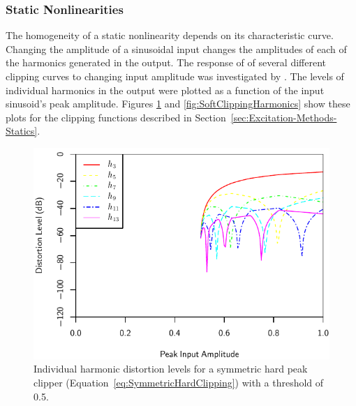 		\subsubsection*{Static Nonlinearities}
			The homogeneity of a static nonlinearity depends on its characteristic curve. Changing the
			amplitude of a sinusoidal input changes the amplitudes of each of the harmonics generated in the
			output. The response of of several different clipping curves to changing input amplitude was
			investigated by \citet{enderby2012harmonic}. The levels of individual harmonics in the output were
			plotted as a function of the input sinusoid's peak amplitude. Figures
			\ref{fig:HardClippingHarmonics} and \ref{fig:SoftClippingHarmonics} show these plots for the
			clipping functions described in Section~\ref{sec:Excitation-Methods-Statics}.

			\begin{figure}[h!]
				\centering
				\includegraphics{chapter5/Images/HardClippingHarmonics.pdf}
				\caption{Individual harmonic distortion levels for a symmetric hard peak clipper
					 (Equation~\ref{eq:SymmetricHardClipping}) with a threshold of 0.5.}
				\label{fig:HardClippingHarmonics}
			\end{figure}

